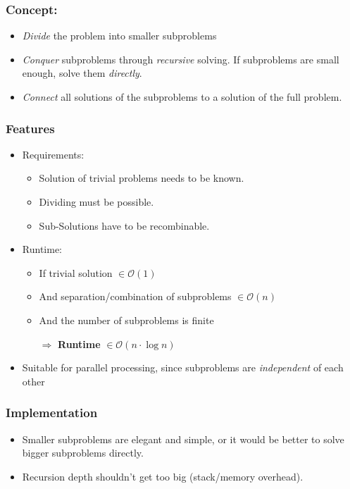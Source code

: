 \documentclass[12pt, a4paper]{scrartcl}
\newcommand{\bigO}{\mathcal{O}}
\renewcommand{\implies}{\Rightarrow}
\begin{document}
\subsubsection*{Concept:}
\begin{itemize}
\item \emph{Divide} the problem into smaller subproblems
\item \emph{Conquer} subproblems through \emph{recursive} solving. If subproblems are small enough, solve them \emph{directly}.
\item \emph{Connect} all solutions of the subproblems to a solution of the full problem.
\end{itemize}

\subsubsection{Features}
\begin{itemize}
\item Requirements:
  \begin{itemize}
  \item Solution of trivial problems needs to be known.
  \item Dividing must be possible.
  \item Sub-Solutions have to be recombinable.
  \end{itemize}
\item Runtime:
  \begin{itemize}
  \item If trivial solution $\in\bigO(1)$
  \item And separation/combination of subproblems $\in\bigO(n)$
  \item And the number of subproblems is finite
  \item[$\implies$] \textbf{Runtime} $\in\bigO(n\cdot\log n)$
  \end{itemize}
\item Suitable for parallel processing, since subproblems are \emph{independent} of each other
\end{itemize}
  
\subsubsection{Implementation}
\begin{itemize}
\item Smaller subproblems are elegant and simple, or it would be better to solve bigger subproblems directly.
\item Recursion depth shouldn't get too big (stack/memory overhead).
\end{itemize}
\end{document}
